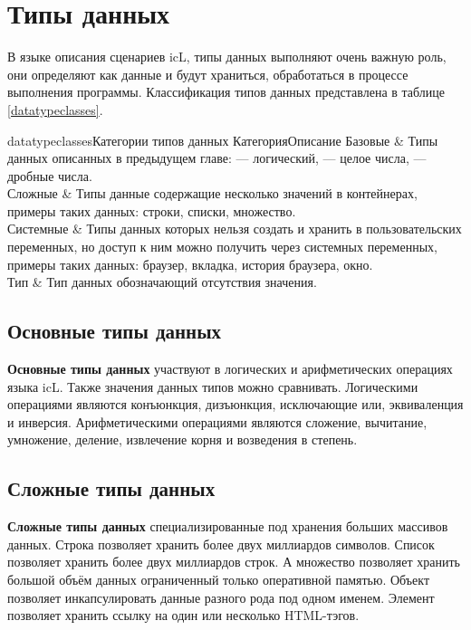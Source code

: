 \section{Типы данных}

В языке описания сценариев icL, типы данных выполняют очень важную роль, они определяют как данные и будут храниться, обработаться в процессе выполнения программы. Классификация типов данных представлена в таблице \ref{datatypeclasses}.

\stabletwo{3.5cm}{13.6cm}
{datatypeclasses}{Категории типов данных}
{Категория}{Описание}
{
	Базовые     & Типы данных описанных в предыдущем главе: \bool{}{} — логический, \integer{} — целое числа, \double{} — дробные числа. \\ \hline
	Сложные     & Типы данные содержащие несколько значений в контейнерах, примеры таких данных: строки, списки, множество. \\ \hline
	Системные   & Типы данных которых нельзя создать и хранить в пользовательских переменных, но доступ к ним можно получить через системных переменных, примеры таких данных: браузер, вкладка, история браузера, окно. \\ \hline
	Тип \void{} & Тип данных обозначающий отсутствия значения.
}

\subsection{Основные типы данных}

{\bf Основные типы данных} участвуют в логических и арифметических операциях языка icL. Также значения данных типов можно сравнивать. Логическими операциями являются конъюнкция, дизъюнкция, исключающие или, эквиваленция и инверсия. Арифметическими операциями являются сложение, вычитание, умножение, деление, извлечение корня и возведения в степень.

\subsection{Сложные типы данных}

{\bf Сложные типы данных} специализированные под хранения больших массивов данных. Строка позволяет хранить более двух миллиардов символов. Список позволяет хранить более двух миллиардов строк. А множество позволяет хранить большой объём данных ограниченный только оперативной памятью. Объект позволяет инкапсулировать данные разного рода под одном именем. Элемент позволяет хранить ссылку на один или несколько HTML-тэгов.

